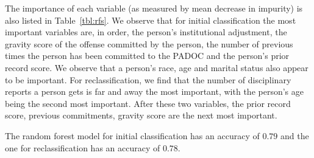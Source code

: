\documentclass{amsproc}
\numberwithin{equation}{section}
\theoremstyle{plain}
\theoremstyle{remark}
\begin{document}
The importance of each variable (as measured by mean decrease in impurity) is also listed in Table~\ref{tbl:rfs}.  We observe that for initial classification the most important variables are, in order,  the person's institutional adjustment, the gravity score of the offense committed by the person, the number of previous times the person has been committed to the PADOC and the person's prior record score.  We observe that a person's race, age and marital status also appear to be important.  For reclassification, we find that the number of disciplinary reports a person gets is far and away the most important, with the person's age being the second most important.  After these two variables, the prior record score, previous commitments, gravity score are the next most important.

The random forest model for initial classification has an accuracy of $0.79$ and the one for reclassification has an accuracy of $0.78$.  
\end{document}
